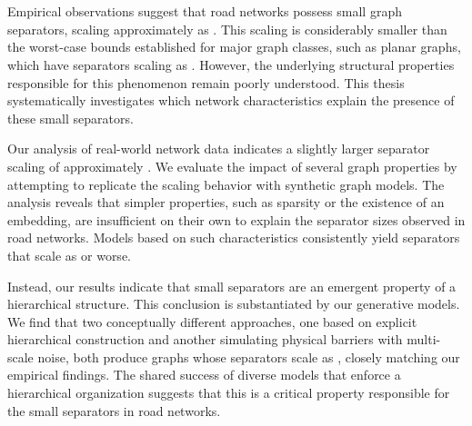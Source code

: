 \section*{\abstractname}

Empirical observations suggest that road networks possess small graph separators, scaling approximately as .
This scaling is considerably smaller than the worst-case bounds established for major graph classes, such as planar graphs, which have separators scaling as .
However, the underlying structural properties responsible for this phenomenon remain poorly understood.
This thesis systematically investigates which network characteristics explain the presence of these small separators.

Our analysis of real-world network data indicates a slightly larger separator scaling of approximately .
We evaluate the impact of several graph properties by attempting to replicate the scaling behavior with synthetic graph models.
The analysis reveals that simpler properties, such as sparsity or the existence of an embedding, are insufficient on their own to explain the separator sizes observed in road networks.
Models based on such characteristics consistently yield separators that scale as  or worse.

Instead, our results indicate that small separators are an emergent property of a hierarchical structure.
This conclusion is substantiated by our generative models.
We find that two conceptually different approaches, one based on explicit hierarchical construction and another simulating physical barriers with multi-scale noise, both produce graphs whose separators scale as , closely matching our empirical findings.
The shared success of diverse models that enforce a hierarchical organization suggests that this is a critical property responsible for the small separators in road networks.
